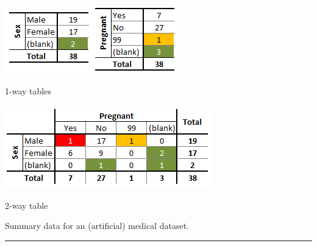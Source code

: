 \begin{table}[t]
       \centering
        \begin{subtable}[b]{0.40\textwidth}
                \centering
                \includegraphics[width=\textwidth]{images/DP/med_sex_preg}
                \caption{\small 1-way tables} \label{tab:1way}
        \end{subtable}
        \begin{subtable}[b]{0.40\textwidth}
                \centering
                \includegraphics[width=\textwidth]{images/DP/med_2_way}
                \caption{\small 2-way table} \label{tab:2way}
        \end{subtable}
        \caption{\small Summary data for an (artificial) medical dataset.}\hrule
        \label{tab:med_data}
\end{table}

